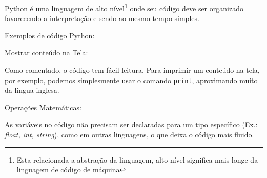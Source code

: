             Python é uma linguagem de alto nível\footnote{Esta relacionada a abstração da linguagem, alto nível significa mais longe da linguagem de código de máquina} onde seu código deve ser organizado favorecendo a interpretação e sendo ao mesmo tempo simples.
            
            Exemplos de código Python:

            Mostrar conteúdo na Tela:
            
            Como comentado, o código tem fácil leitura. Para imprimir um conteúdo na tela, por exemplo, 
            podemos simplesmente usar o comando \verb|print|, aproximando muito da língua inglesa.  
            \begin{quote}
                                                       

            \end{quote}
            
            Operações Matemáticas:
            
            As variáveis no código não precisam ser declaradas para um 
            tipo específico (Ex.: \textit{float, int, string}), como em outras linguagens, o que deixa o código mais fluido. 
            \begin{quote}
            
                                                       
            \end{quote}
            
